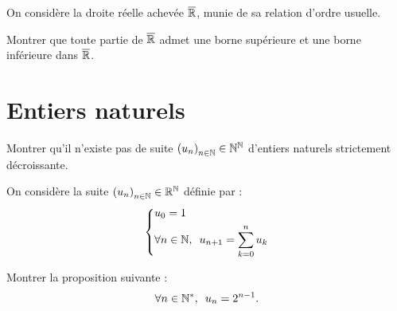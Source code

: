 \begin{corr}
\end{corr}

\begin{exo}[Exercice 19]
On considère la droite réelle achevée \(\overline{\mathbb{R}}\), munie de sa relation d'ordre usuelle.

Montrer que toute partie de \(\overline{\mathbb{R}}\) admet une borne supérieure et une borne inférieure dans \(\overline{\mathbb{R}}\).
\end{exo}

\begin{corr}
\end{corr}

\section{Entiers naturels}

\begin{exo}
Montrer qu'il n'existe pas de suite \(\left(u_n\right)_{n\in\mathbb{N}}\in\mathbb{N}^{\mathbb{N}}\) d'entiers naturels strictement décroissante.
\end{exo}

\begin{corr}
\end{corr}

\begin{exo}[Exercice 21]
On considère la suite \(\left(u_n\right)_{n\in\mathbb{N}}\in\mathbb{R}^{\mathbb{N}}\) définie par : \[\begin{dcases}u_0=1 \\ \quantifs{\forall n\in\N}u_{n+1}=\sum_{k=0}^{n}u_k\end{dcases}\]

Montrer la proposition suivante : \[\quantifs{\forall n\in\Ns}u_n=2^{n-1}.\]
\end{exo}

\begin{corr}
\end{corr}